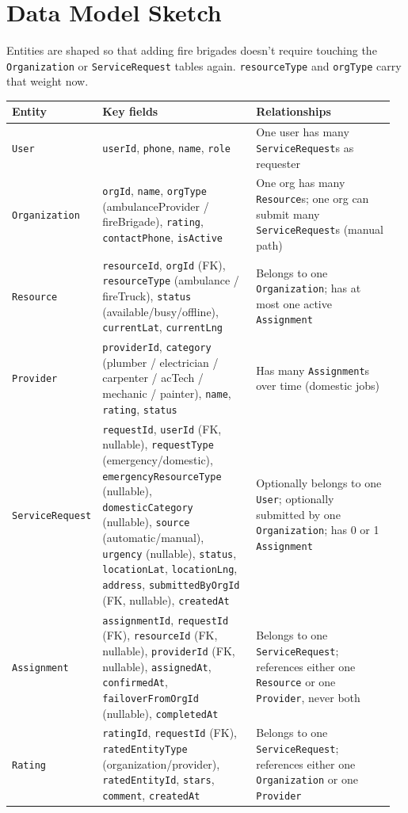 \documentclass[11pt,a4paper]{article}
\begin{document}
\section{Data Model Sketch}

Entities are shaped so that adding fire brigades doesn't require touching the \texttt{Organization} or \texttt{ServiceRequest} tables again. \texttt{resourceType} and \texttt{orgType} carry that weight now.

\small
\begin{longtable}{p{0.17\linewidth} p{0.41\linewidth} p{0.38\linewidth}}
\toprule
\textbf{Entity} & \textbf{Key fields} & \textbf{Relationships} \\
\midrule
\endhead
\texttt{User} & \texttt{userId}, \texttt{phone}, \texttt{name}, \texttt{role} & One user has many \texttt{ServiceRequest}s as requester \\
\addlinespace
\texttt{Organization} & \texttt{orgId}, \texttt{name}, \texttt{orgType} (ambulanceProvider / fireBrigade), \texttt{rating}, \texttt{contactPhone}, \texttt{isActive} & One org has many \texttt{Resource}s; one org can submit many \texttt{ServiceRequest}s (manual path) \\
\addlinespace
\texttt{Resource} & \texttt{resourceId}, \texttt{orgId} (FK), \texttt{resourceType} (ambulance / fireTruck), \texttt{status} (available/busy/offline), \texttt{currentLat}, \texttt{currentLng} & Belongs to one \texttt{Organization}; has at most one active \texttt{Assignment} \\
\addlinespace
\texttt{Provider} & \texttt{providerId}, \texttt{category} (plumber / electrician / carpenter / acTech / mechanic / painter), \texttt{name}, \texttt{rating}, \texttt{status} & Has many \texttt{Assignment}s over time (domestic jobs) \\
\addlinespace
\texttt{ServiceRequest} & \texttt{requestId}, \texttt{userId} (FK, nullable), \texttt{requestType} (emergency/domestic), \texttt{emergencyResourceType} (nullable), \texttt{domesticCategory} (nullable), \texttt{source} (automatic/manual), \texttt{urgency} (nullable), \texttt{status}, \texttt{locationLat}, \texttt{locationLng}, \texttt{address}, \texttt{submittedByOrgId} (FK, nullable), \texttt{createdAt} & Optionally belongs to one \texttt{User}; optionally submitted by one \texttt{Organization}; has 0 or 1 \texttt{Assignment} \\
\addlinespace
\texttt{Assignment} & \texttt{assignmentId}, \texttt{requestId} (FK), \texttt{resourceId} (FK, nullable), \texttt{providerId} (FK, nullable), \texttt{assignedAt}, \texttt{confirmedAt}, \texttt{failoverFromOrgId} (nullable), \texttt{completedAt} & Belongs to one \texttt{ServiceRequest}; references either one \texttt{Resource} or one \texttt{Provider}, never both \\
\addlinespace
\texttt{Rating} & \texttt{ratingId}, \texttt{requestId} (FK), \texttt{ratedEntityType} (organization/provider), \texttt{ratedEntityId}, \texttt{stars}, \texttt{comment}, \texttt{createdAt} & Belongs to one \texttt{ServiceRequest}; references either one \texttt{Organization} or one \texttt{Provider} \\
\bottomrule
\end{longtable}
\normalsize
\end{document}
